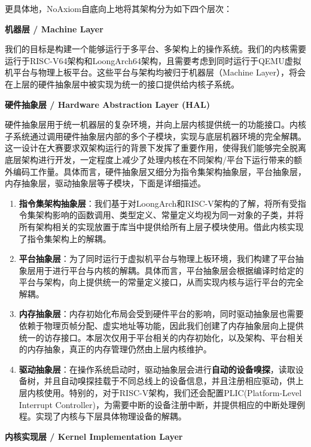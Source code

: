 \documentclass{article}
\begin{document}
更具体地，NoAxiom自底向上地将其架构分为如下四个层次：

\quad \textbf{机器层 / Machine Layer}

我们的目标是构建一个能够运行于多平台、多架构上的操作系统。我们的内核需要运行于RISC-V64架构和LoongArch64架构，且需要考虑到同时运行于QEMU虚拟机平台与物理上板平台。这些平台与架构均被归于机器层（Machine Layer），将会在上层的硬件抽象层中被实现为统一的接口提供给内核子系统。

\quad \textbf{硬件抽象层 / Hardware Abstraction Layer (HAL)}

硬件抽象层用于统一机器层的复杂环境，并向上层内核提供统一的功能接口。内核子系统通过调用硬件抽象层内部的多个子模块，实现与底层机器环境的完全解耦。这一设计在大赛要求双架构运行的背景下发挥了重要作用，使得我们能够完全脱离底层架构进行开发，一定程度上减少了处理内核在不同架构/平台下运行带来的额外编码工作量。具体而言，硬件抽象层又细分为指令集架构抽象层，平台抽象层，内存抽象层，驱动抽象层等子模块，下面是详细描述。

\begin{enumerate}
    \item \textbf{指令集架构抽象层}：我们基于对LoongArch和RISC-V架构的了解，将所有受指令集架构影响的函数调用、类型定义、常量定义均视为同一对象的子类，并将所有架构相关的实现放置于库当中提供给所有上层子模块使用。借此内核实现了指令集架构上的解耦。
    \item \textbf{平台抽象层}：为了同时运行于虚拟机平台与物理上板环境，我们构建了平台抽象层用于进行平台与内核的解耦。具体而言，平台抽象层会根据编译时给定的平台与架构，向上提供统一的常量定义接口，从而实现内核与运行平台的完全解耦。
    \item \textbf{内存抽象层}：内存初始化布局会受到硬件平台的影响，同时驱动抽象层也需要依赖于物理页帧分配、虚实地址等功能，因此我们创建了内存抽象层向上提供统一的访存接口。本层次仅用于平台相关的内存初始化，以及架构、平台相关的内存抽象，真正的内存管理仍然由上层内核维护。
    \item \textbf{驱动抽象层}：在操作系统启动时，驱动抽象层会进行\textbf{自动的设备嗅探}，读取设备树，并且自动嗅探挂载于不同总线上的设备信息，并且注册相应驱动，供上层内核使用。特别的，对于RISC-V架构，我们还会配置PLIC(Platform-Level Interrupt Controller)，为需要中断的设备注册中断，并提供相应的中断处理例程。实现了内核与下层具体物理设备的解耦。
\end{enumerate}

\quad \textbf{内核实现层 / Kernel Implementation Layer}
\end{document}
